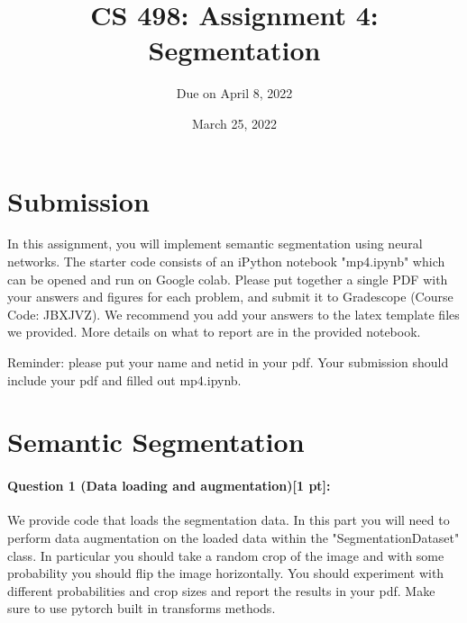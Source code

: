 \documentclass[11pt]{article}
\begin{document}
\author{Due on April 8, 2022}
\title{CS 498: Assignment 4: Segmentation}
\date{March 25, 2022}
\maketitle

\medskip


\section*{Submission}
In this assignment, you will implement semantic segmentation using neural networks. The starter code consists of an iPython notebook "mp4.ipynb" which can be opened and run on Google colab. Please put together a single PDF with your answers and figures for each problem, and submit it to Gradescope (Course Code: JBXJVZ). 
We recommend you add your answers to the latex template files we provided. More details on what to report are in the provided notebook. 

Reminder: please put your name and netid in your pdf.
Your submission should include your pdf and filled out mp4.ipynb.

\section*{Semantic Segmentation} 

\paragraph{Question 1 (Data loading and augmentation)[1 pt]:}
We provide code that loads the segmentation data. In this part you will need to perform data augmentation on the loaded data within the "SegmentationDataset" class. In particular you should take a random crop of the image and with some probability you should flip the image horizontally. You should experiment with different probabilities and crop sizes and report the results in your pdf. Make sure to use pytorch built in transforms methods.
\end{document}
